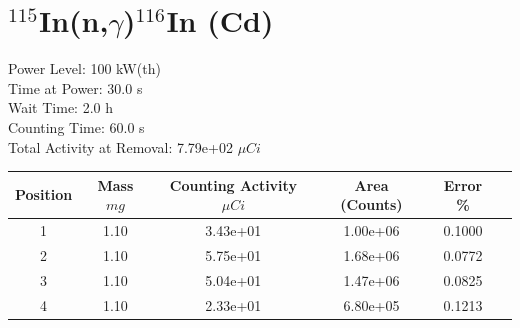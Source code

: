 \newpage

\section*{ $^{115}$In(n,$\gamma$)$^{116}$In (Cd) }

Power Level: 100 kW(th) \\
Time at Power: 30.0 s \\
Wait Time:  2.0 h \\
Counting Time: 60.0 s \\
Total Activity at Removal: 7.79e+02 $\mu Ci$

\begin{table}[h]
\centering
\begin{tabular}{ |c|c|c|c|c|c| }
 \hline
 Position & Mass $mg$ & Counting Activity $\mu Ci$ & Area (Counts) & Error \% \\
 \hline 
 1 & 1.10 & 3.43e+01 & 1.00e+06 & 0.1000 \\ 
\hline
 2 & 1.10 & 5.75e+01 & 1.68e+06 & 0.0772 \\ 
\hline
 3 & 1.10 & 5.04e+01 & 1.47e+06 & 0.0825 \\ 
\hline
 4 & 1.10 & 2.33e+01 & 6.80e+05 & 0.1213 \\ 
\hline
\end{tabular}
\end{table}

